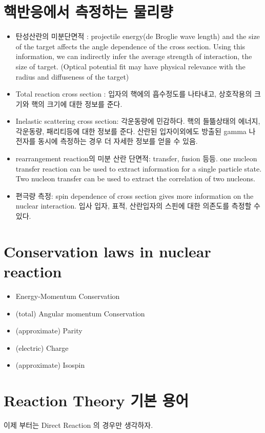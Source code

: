\documentclass[11pt]{book}
\begin{document}
\section{핵반응에서 측정하는 물리량}
\begin{itemize}
\item 탄성산란의 미분단면적 : projectile energy(de Broglie wave length) and the size of the target
      affects the angle dependence of the cross section. Using this information, we can indirectly
      infer the average strength of interaction, the size of target.
      (Optical potential fit may have physical relevance with the radius and diffuseness of
      the target)
\item Total reaction cross section : 입자의 핵에의 흡수정도를 나타내고, 상호작용의 크기와 핵의 크기에 대한 정보를 준다. 
\item Inelastic scattering cross section: 각운동량에 민감하다. 핵의 들뜲상태의 에너지, 각운동량, 패리티등에 대한 정보를 준다. 산란된 입자이외에도 방출된 gamma 나 전자를 동시에 측정하는 경우 더 자세한 정보를 얻을 수 있음. 
\item rearrangement reaction의 미분 산란 단면적: transfer, fusion 등등. one nucleon transfer reaction can be used to extract information for a single particle state. Two nucleon transfer can be used to
extract the correlation of two nucleons. 
\item 편극량 측정: spin dependence of cross section gives more information on the nuclear interaction. 입사 입자, 표적, 산란입자의 스핀에 대한 의존도를 측정할 수 있다.  
\end{itemize}

\section{Conservation laws in nuclear reaction} 
\begin{itemize}
\item Energy-Momentum Conservation
\item (total) Angular momentum Conservation
\item (approximate) Parity
\item (electric) Charge
\item (approximate) Isospin
\end{itemize}

\section{Reaction Theory 기본 용어}
이제 부터는 Direct Reaction 의 경우만 생각하자. 
\end{document}
